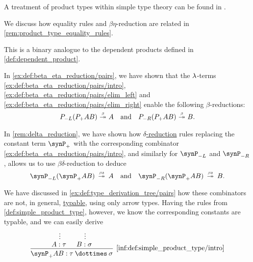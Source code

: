 \begin{comments}
  \item A treatment of product types within simple type theory can be found in \cite[\S 4.3.1]{Mimram2020ProgramEqualsProof}.

  \item We discuss how equality rules and \( \beta\eta \)-reduction are related in \cref{rem:product_type_equality_rules}.

  \item This is a binary analogue to the dependent products defined in \cref{def:dependent_product}.
\end{comments}

\begin{remark}\label{rem:product_type_equality_rules}
  In \cref{ex:def:beta_eta_reduction/pairs}, we have shown that the \( {\mathrm \lambda} \)-terms \ref{ex:def:beta_eta_reduction/pairs/intro}, \ref{ex:def:beta_eta_reduction/pairs/elim_left} and \ref{ex:def:beta_eta_reduction/pairs/elim_right} enable the following \( \beta \)-reductions:
  \begin{align}\label{eq:rem:product_type_equality_rules/beta}
    P_{-L} (P_+ A B) \bred* A
    &&
    \T{and}
    &&
    P_{-R} (P_+ A B) \bred* B.
  \end{align}

  In \cref{rem:delta_reduction}, we have shown how \hyperref[def:delta_reduction]{\( \delta \)-reduction} rules replacing the constant term \( \synP_+ \) with the corresponding combinator \ref{ex:def:beta_eta_reduction/pairs/intro}, and similarly for \( \synP_{-L} \) and \( \synP_{-R} \), allows us to use \( \beta\delta \)-reduction to deduce
  \begin{align*}
    \synP_{-L} (\synP_+ A B) \redrel*{\beta\delta} A
    &&
    \T{and}
    &&
    \synP_{-R} (\synP_+ A B) \redrel*{\beta\delta} B.
  \end{align*}

  We have discussed in \cref{ex:def:type_derivation_tree/pairs} how these combinators are not, in general, \hyperref[def:typability]{typable}, using only arrow types. Having the rules from \cref{def:simple_product_type}, however, we know the corresponding constants are typable, and we can easily derive
  \begin{equation*}
    \begin{prooftree}
      \hypo {}
      \ellipsis {} { A: \tau }

      \hypo {}
      \ellipsis {} { B: \sigma }

      \infer2[\ref{inf:def:simple_product_type/intro}]{ \synP_+ AB: \tau \syntimes \sigma }


\end{prooftree}
\end{equation*}
\end{remark}
